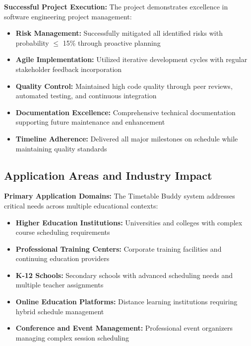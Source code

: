 \textbf{Successful Project Execution:}
The project demonstrates excellence in software engineering project management:

\begin{itemize}[leftmargin=*]
    \item \textbf{Risk Management:} Successfully mitigated all identified risks with probability $\leq$ 15\% through proactive planning
    \item \textbf{Agile Implementation:} Utilized iterative development cycles with regular stakeholder feedback incorporation
    \item \textbf{Quality Control:} Maintained high code quality through peer reviews, automated testing, and continuous integration
    \item \textbf{Documentation Excellence:} Comprehensive technical documentation supporting future maintenance and enhancement
    \item \textbf{Timeline Adherence:} Delivered all major milestones on schedule while maintaining quality standards
\end{itemize}

\subsection{Application Areas and Industry Impact}

\textbf{Primary Application Domains:}
The Timetable Buddy system addresses critical needs across multiple educational contexts:

\begin{itemize}[leftmargin=*]
    \item \textbf{Higher Education Institutions:} Universities and colleges with complex course scheduling requirements
    \item \textbf{Professional Training Centers:} Corporate training facilities and continuing education providers
    \item \textbf{K-12 Schools:} Secondary schools with advanced scheduling needs and multiple teacher assignments
    \item \textbf{Online Education Platforms:} Distance learning institutions requiring hybrid schedule management
    \item \textbf{Conference and Event Management:} Professional event organizers managing complex session scheduling
\end{itemize}

